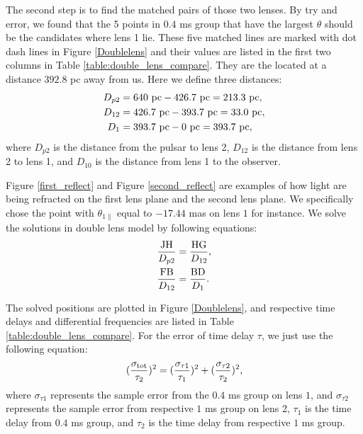 \documentclass[useAMS,usenatbib]{mn2e}
\begin{document}
The second step is to find the matched pairs of those two lenses. By try and error, we found that the 5 points in $0.4$ ms group that have the largest $\theta$ should be the candidates where lens 1 lie.  These five matched lines are marked with dot dash lines in Figure \ref{Doublelens} and their values are listed in the first two columns in Table \ref{table:double_lens_compare}. They are the located at a distance $392.8$ pc away from us. Here we define three distances:
\begin{align*}
D_{p2}&=640~{\rm pc}-426.7~{\rm pc} =213.3~{\rm pc},\\
D_{12}&=426.7~{\rm pc}-393.7~{\rm pc} =33.0~{\rm pc},\\
D_{1}&=393.7~{\rm pc}- 0~{\rm pc} = 393.7~{\rm pc}, 
\end{align*} 
where $D_{p2}$ is the distance from the pulsar to lens 2, $D_{12}$ is the distance from lens 2 to lens 1, and $D_{10}$ is the distance from lens 1 to the observer.

Figure \ref{first_reflect} and Figure \ref{second_reflect} are examples of how light are being refracted on the first lens plane and the second lens plane. We specifically chose the point with $\theta_{1\parallel}$ equal to $-17.44$ mas on lens $1$ for instance. We solve the solutions in double lens model by following equations:
\begin{align*}
\frac{\rm JH}{D_{p2}}&=\frac{\rm HG}{D_{12}},\\
\frac{\rm FB}{D_{12}}&=\frac{\rm BD}{D_{1}}.
\end{align*}

The solved positions are plotted in Figure \ref{Doublelens}, and respective time delays and differential frequencies are listed in Table \ref{table:double_lens_compare}. For the error of time delay $\tau$, we just use the following equation: 
\begin{align*}
(\frac{\sigma_{\rm tot}}{\tau_2})^2 = (\frac{\sigma_{\tau1}}{\tau_1})^2+(\frac{\sigma_{\tau2}}{\tau_2})^2,
\end{align*}
where $\sigma_{\tau1}$ represents the sample error from the $0.4$ ms group on lens $1$, and $\sigma_{\tau2}$ represents the sample error from respective $1$ ms group on lens 2, $\tau_1$ is the time delay from $0.4$ ms group, and $\tau_2$ is the time delay from respective $1$ ms group.
\end{document}
